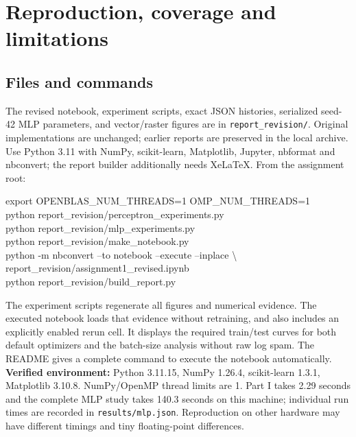 \documentclass[10pt,a4paper]{article}
\newcommand{\code}[1]{\texttt{\small #1}}
\begin{document}
\clearpage
\section{Reproduction, coverage and limitations}
\subsection{Files and commands}
The revised notebook, experiment scripts, exact JSON histories, serialized
seed-42 MLP parameters, and vector/raster figures are in \code{report\_revision/}.
Original implementations are unchanged; earlier reports are preserved in
the local archive. Use
Python 3.11 with NumPy, scikit-learn, Matplotlib, Jupyter, nbformat and
nbconvert; the report builder additionally needs XeLaTeX.
From the assignment root:
\begin{tcolorbox}\small\ttfamily
export OPENBLAS\_NUM\_THREADS=1 OMP\_NUM\_THREADS=1\\
python report\_revision/perceptron\_experiments.py\\
python report\_revision/mlp\_experiments.py\\
python report\_revision/make\_notebook.py\\
python -m nbconvert --to notebook --execute --inplace \textbackslash{}\\
\hspace*{1em}report\_revision/assignment1\_revised.ipynb\\
python report\_revision/build\_report.py
\end{tcolorbox}
The experiment scripts regenerate all figures and numerical evidence. The
executed notebook loads that evidence without retraining, and also includes
an explicitly enabled rerun cell. It displays the required train/test curves
for both default optimizers and the batch-size analysis without raw log spam.
The README gives a complete command to execute the notebook automatically.
\textbf{Verified environment:} Python 3.11.15, NumPy
1.26.4, scikit-learn 1.3.1, Matplotlib
3.10.8. NumPy/OpenMP thread limits are 1. Part I takes
2.29 seconds and the complete MLP study takes
140.3 seconds on this machine; individual run
times are recorded in \code{results/mlp.json}. Reproduction on other
hardware may have different timings and tiny floating-point differences.
\end{document}
